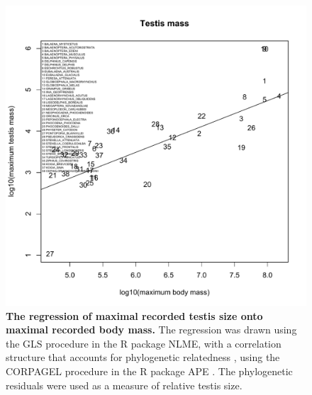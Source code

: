 \documentclass[12pt]{article}
\begin{document}
 
\begin{figure}
\begin{center}
  \includegraphics[width=\textwidth]{S4}
\end{center}
\caption{
\textbf{The regression of maximal recorded testis size onto maximal
recorded body mass.} The regression was drawn using the GLS procedure in the R package NLME,
with a correlation structure that accounts for phylogenetic relatedness \citep{pagel1999}, using the CORPAGEL
procedure in the R package APE \citep{paradis2004}. The phylogenetic residuals were used as a measure of relative
testis size.
}
\end{figure}
\end{document}
